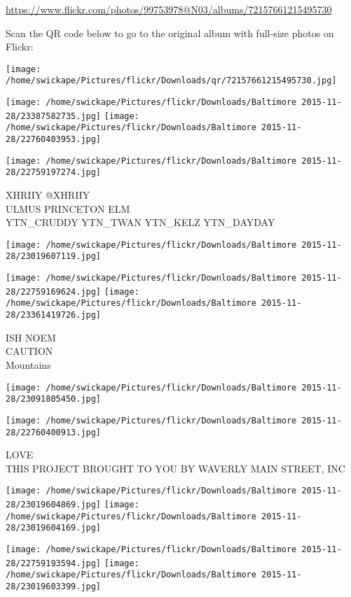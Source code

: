 \documentclass[10pt,letterpaper]{article}
\begin{document}
\url{https://www.flickr.com/photos/99753978@N03/albums/72157661215495730}

Scan the QR code below to go to the original album with full-size photos on Flickr:

\texttt{[image: /home/swickape/Pictures/flickr/Downloads/qr/72157661215495730.jpg]}
\pagebreak

\texttt{[image: /home/swickape/Pictures/flickr/Downloads/Baltimore 2015-11-28/23387582735.jpg]}
\texttt{[image: /home/swickape/Pictures/flickr/Downloads/Baltimore 2015-11-28/22760403953.jpg]}

\texttt{[image: /home/swickape/Pictures/flickr/Downloads/Baltimore 2015-11-28/22759197274.jpg]}

XHRIIY @XHRIIY\\
ULMUS PRINCETON ELM\\
YTN\_CRUDDY YTN\_TWAN YTN\_KELZ YTN\_DAYDAY
\pagebreak

\texttt{[image: /home/swickape/Pictures/flickr/Downloads/Baltimore 2015-11-28/23019607119.jpg]}

\vspace{0.25in}
\texttt{[image: /home/swickape/Pictures/flickr/Downloads/Baltimore 2015-11-28/22759169624.jpg]}
\texttt{[image: /home/swickape/Pictures/flickr/Downloads/Baltimore 2015-11-28/23361419726.jpg]}

ISH NOEM\\
CAUTION\\
Mountains
\pagebreak

\texttt{[image: /home/swickape/Pictures/flickr/Downloads/Baltimore 2015-11-28/23091805450.jpg]}

\vspace{0.25in}
\texttt{[image: /home/swickape/Pictures/flickr/Downloads/Baltimore 2015-11-28/22760400913.jpg]}

LOVE\\
THIS PROJECT BROUGHT TO YOU BY WAVERLY MAIN STREET, INC
\pagebreak

\texttt{[image: /home/swickape/Pictures/flickr/Downloads/Baltimore 2015-11-28/23019604869.jpg]}
\texttt{[image: /home/swickape/Pictures/flickr/Downloads/Baltimore 2015-11-28/23019604169.jpg]}

\texttt{[image: /home/swickape/Pictures/flickr/Downloads/Baltimore 2015-11-28/22759193594.jpg]}
\texttt{[image: /home/swickape/Pictures/flickr/Downloads/Baltimore 2015-11-28/23019603399.jpg]}
\end{document}
